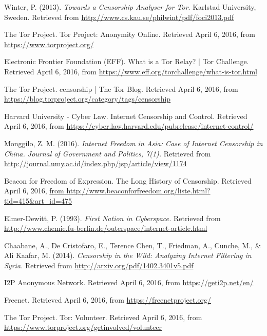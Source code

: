 \documentclass[a4paper,10pt]{article}
\begin{document}
\begin{thebibliography}{99}

Winter, P. (2013). 
\emph{Towards a Censorship Analyser for Tor}. 
Karlstad University, Sweden. 
Retrieved from \url{http://www.cs.kau.se/philwint/pdf/foci2013.pdf}

The Tor Project. 
Tor Project: Anonymity Online. 
Retrieved April 6, 2016, from \url{https://www.torproject.org/}

Electronic Frontier Foundation (EFF). 
What is a Tor Relay? | Tor Challenge. 
Retrieved April 6, 2016, from \url{https://www.eff.org/torchallenge/what-is-tor.html}

The Tor Project.
censorship | The Tor Blog.
Retrieved April 6, 2016, from \url{https://blog.torproject.org/category/tags/censorship}

Harvard University - Cyber Law.
Internet Censorship and Control.
Retrieved April 6, 2016, from \url{https://cyber.law.harvard.edu/pubrelease/internet-control/}

Monggilo, Z. M. (2016).
\emph{Internet Freedom in Asia: Case of Internet Censorship in China. Journal of Government and Politics, 7(1).}
Retrieved from \url{http://journal.umy.ac.id/index.php/jsp/article/view/1174}

Beacon for Freedom of Expression.
The Long History of Censorship.
Retrieved April 6, 2016, \url{from http://www.beaconforfreedom.org/liste.html?tid=415&art_id=475}

Elmer-Dewitt, P. (1993). 
\emph{First Nation in Cyberspace.} 
Retrieved from \url{http://www.chemie.fu-berlin.de/outerspace/internet-article.html}

Chaabane, A., De Cristofaro, E., Terence Chen, T., Friedman, A., Cunche, M., \& Ali Kaafar, M. (2014).
\emph{Censorship in the Wild: Analyzing Internet Filtering in Syria.}
Retrieved from \url{http://arxiv.org/pdf/1402.3401v5.pdf}

I2P Anonymous Network. 
Retrieved April 6, 2016, from \url{https://geti2p.net/en/}

Freenet. 
Retrieved April 6, 2016, from \url{https://freenetproject.org/}

The Tor Project. 
Tor: Volunteer. 
Retrieved April 6, 2016, from \url{https://www.torproject.org/getinvolved/volunteer}


\end{thebibliography}
\end{document}
